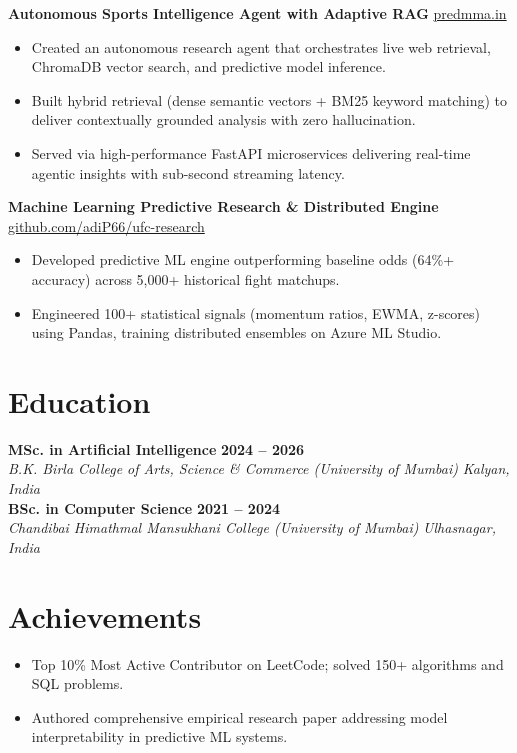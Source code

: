 \documentclass[10pt,a4paper]{article}
\begin{document}
\textbf{Autonomous Sports Intelligence Agent with Adaptive RAG} \hfill \href{https://predmma.in}{predmma.in}
\begin{itemize}
    \item Created an autonomous research agent that orchestrates live web retrieval, ChromaDB vector search, and predictive model inference.
    \item Built hybrid retrieval (dense semantic vectors + BM25 keyword matching) to deliver contextually grounded analysis with zero hallucination.
    \item Served via high-performance FastAPI microservices delivering real-time agentic insights with sub-second streaming latency.
\end{itemize}

\textbf{Machine Learning Predictive Research \& Distributed Engine} \hfill \href{https://github.com/adiP66/ufc-research}{github.com/adiP66/ufc-research}
\begin{itemize}
    \item Developed predictive ML engine outperforming baseline odds (64\%+ accuracy) across 5,000+ historical fight matchups.
    \item Engineered 100+ statistical signals (momentum ratios, EWMA, z-scores) using Pandas, training distributed ensembles on Azure ML Studio.
\end{itemize}

\section*{Education}
\textbf{MSc. in Artificial Intelligence} \hfill \textbf{2024 -- 2026} \\
\textit{B.K. Birla College of Arts, Science \& Commerce (University of Mumbai)} \hfill \textit{Kalyan, India} \\[3pt]
\textbf{BSc. in Computer Science} \hfill \textbf{2021 -- 2024} \\
\textit{Chandibai Himathmal Mansukhani College (University of Mumbai)} \hfill \textit{Ulhasnagar, India}

\section*{Achievements}
\begin{itemize}
    \item Top 10\% Most Active Contributor on LeetCode; solved 150+ algorithms and SQL problems.
    \item Authored comprehensive empirical research paper addressing model interpretability in predictive ML systems.
\end{itemize}
\end{document}
